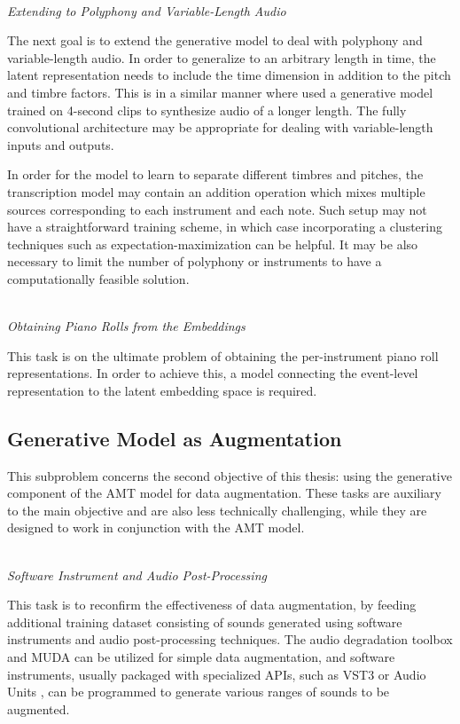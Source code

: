 \mbox{}\\\noindent\emph{Extending to Polyphony and Variable-Length Audio}\mbox{}

The next goal is to extend the generative model to deal with polyphony and variable-length audio.
In order to generalize to an arbitrary length in time, the latent representation needs to include the time dimension in addition to the pitch and timbre factors.
This is in a similar manner where  used a generative model trained on 4-second clips to synthesize audio of a longer length.
The fully convolutional architecture \cite{shelhamer2017fcn} may be appropriate for dealing with variable-length inputs and outputs.

In order for the model to learn to separate different timbres and pitches, the transcription model may contain an addition operation which mixes multiple sources corresponding to each instrument and each note.
Such setup may not have a straightforward training scheme, in which case incorporating a clustering techniques such as expectation-maximization can be helpful.
It may be also necessary to limit the number of polyphony or instruments to have a computationally feasible solution.

\mbox{}\\\noindent\emph{Obtaining Piano Rolls from the Embeddings}\mbox{}

This task is on the ultimate problem of obtaining the per-instrument piano roll representations.
In order to achieve this, a model connecting the event-level representation to the latent embedding space is required.

\subsection{Generative Model as Augmentation}

This subproblem concerns the second objective of this thesis: using the generative component of the AMT model for data augmentation.
These tasks are auxiliary to the main objective and are also less technically challenging, while they are designed to work in conjunction with the AMT model.

\mbox{}\\\noindent\emph{Software Instrument and Audio Post-Processing}\mbox{}

This task is to reconfirm the effectiveness of data augmentation, by feeding additional training dataset consisting of sounds generated using software instruments and audio post-processing techniques.
The audio degradation toolbox \cite{mauch2013adt} and MUDA \cite{mcfee2015muda} can be utilized for simple data augmentation, and software instruments, usually packaged with specialized APIs, such as VST3 or Audio Units \cite{pirkle2014synthesizer}, can be programmed to generate various ranges of sounds to be augmented.

